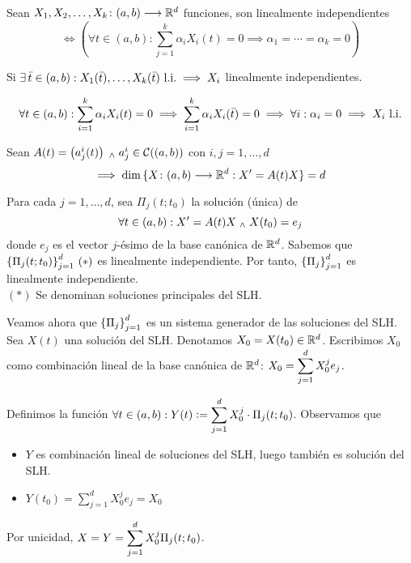 \begin{defn}
	Sean $X_1, X_2, \ldots, X_k \colon (a, b) \longrightarrow \mathbb{R}^d$ funciones, son linealmente independientes
	\[\iff \left(\forall t \in (a, b) : \sum_{j=1}^{k} \alpha_i X_i (t) = 0 \implies \alpha_1 = \cdots = \alpha_k = 0 \right)\]
\end{defn}

\begin{prop}
	Si $\exists \, \Bar{t} \in (a,b) : X_1(\Bar{t}) , \dots , X_k(\Bar{t}) \text{ l.i.}\implies X_i$ linealmente independientes.
	\begin{dem}
		\[\forall t \in (a,b) : \sum_{i=1}^k \alpha_i X_i(t) = 0 \implies \sum_{i=1}^k \alpha_i X_i(\Bar{t}) = 0 \implies \forall i : \alpha_i = 0 \implies X_i  \text{ l.i.}\]
	\end{dem}
\end{prop}


\begin{prop}
	Sean $A(t) = \left(a^i_j(t)\right) \; _{\wedge} \; a^i_j \in \mathcal{C}((a,b))$ con $i,j=1,\ldots,d$
	\[\implies \dim{\{X \colon (a,b) \longrightarrow \mathbb{R}^d : X'=A(t)X\}} = d\]
	\begin{dem}
		Para cada $j=1, \dots, d$, sea $\Pi_j(t;t_0)$ la solución (única) de
		\[\forall t \in (a,b) : X'=A(t)X \; _{\wedge} \; X(t_0) = e_j\]
		donde $e_j$ es el vector $j$-ésimo de la base canónica de $\mathbb{R}^d$. Sabemos que $\displaystyle \left\{\Pi_j(t; t_0)\right\}_{j=1}^d \,(*)$ es linealmente independiente. Por tanto, $\displaystyle \left\{\Pi_j\right\}_{j=1}^d$ es linealmente independiente. \\
		\hspace*{\fill} $(*)$ Se denominan soluciones principales del SLH.

		Veamos ahora que $\displaystyle \left\{\Pi_j\right\}_{j=1}^d$ es un sistema generador de las soluciones del SLH. Sea $X(t)$ una solución del SLH. Denotamos $X_0=X(t_0) \in \mathbb{R}^d$. Escribimos $X_0$ como combinación lineal de la base canónica de $\mathbb{R}^d$: $\displaystyle X_0 = \sum_{j=1}^{d} X_0^j e_j$.

		Definimos la función $\displaystyle \forall t \in (a, b) : Y(t)\vcentcolon= \sum_{j=1}^{d} X_0^j \cdot \Pi_j(t;t_0)$. Observamos que
		\begin{itemize}
			\item $Y$ es combinación lineal de soluciones del SLH, luego también es solución del SLH.
			\item $Y(t_0) = \sum_{j=1}^{d} X_0^j e_j = X_0$
		\end{itemize}
		Por unicidad, $\displaystyle X = Y = \sum_{j=1}^{d} X_0^j \Pi_j(t;t_0)$.
	\end{dem}
\end{prop}

